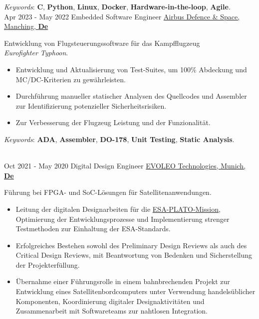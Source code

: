 \documentclass[letterpaper]{twentysecondcv} %
\begin{document}
\begin{twenty}
{            \vspace{1 mm}
            \textit{Keywords}: \textbf{C}, \textbf{Python}, \textbf{Linux}, \textbf{Docker}, \textbf{Hardware-in-the-loop}, \textbf{Agile}.
        }\\
    \twentyitem
        {Apr 2023 -}
        {May 2022}
        {Embedded Software Engineer}
        {\href{https://www.airbus.com/en/who-we-are}{Airbus Defence \& Space, Manching, \textbf{De}}}
        {}
        {
            Entwicklung von Flugsteuerungssoftware für das Kampfflugzeug \\\textit{Eurofighter Typhoon}.
            \vspace{1 mm}
            \begin{itemize}
                \item Entwicklung und Aktualisierung von Test-Suites, um 100\% Abdeckung und MC/DC-Kriterien zu gewährleisten.
                \item Durchführung manueller statischer Analysen des Quellcodes und Assembler zur Identifizierung potenzieller Sicherheitsrisiken.
                \item Zur Verbesserung der Flugzeug Leistung und der Funzionalität.
            \end{itemize}

            \vspace{1 mm}
            \textit{Keywords}: \textbf{ADA}, \textbf{Assembler}, \textbf{DO-178}, \textbf{Unit Testing}, \textbf{Static Analysis}.
        }\\
    \twentyitem
        {Oct 2021 -}
    	{May 2020}
        {Digital Design Engineer}
        {\href{http://evoleotech.com/company/}{EVOLEO Technologies, Munich, \textbf{De}}}
        {}
        {
            Führung bei FPGA- und SoC-Lösungen für Satellitenanwendungen.
            \vspace{1 mm}
            \begin{itemize}
                \item Leitung der digitalen Designarbeiten für die \href{https://sci.esa.int/web/plato}{ESA-PLATO-Mission}, Optimierung der Entwicklungsprozesse und Implementierung strenger Testmethoden zur Einhaltung der ESA-Standards.
                \item Erfolgreiches Bestehen sowohl des Preliminary Design Reviews als auch des Critical Design Reviews, mit Beantwortung von Bedenken und Sicherstellung der Projekterfüllung.
                \item Übernahme einer Führungsrolle in einem bahnbrechenden Projekt zur Entwicklung eines Satellitenbordcomputers unter Verwendung handelsüblicher Komponenten, Koordinierung digitaler Designaktivitäten und Zusammenarbeit mit Softwareteams zur nahtlosen Integration.
            \end{itemize}

}
\end{twenty}
\end{document}
